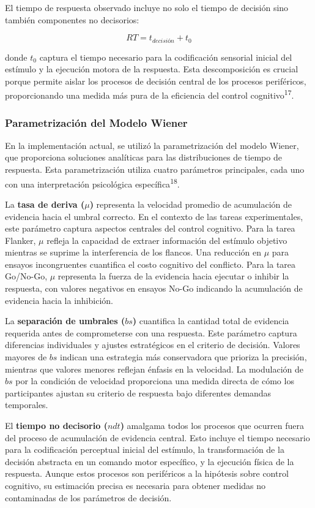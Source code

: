 \documentclass[
  spanish,
  10pt,
]{article}
\begin{document}
El tiempo de respuesta observado incluye no solo el tiempo de decisión
sino también componentes no decisorios:

\[RT = t_{decisión} + t_0\]

donde \(t_0\) captura el tiempo necesario para la codificación sensorial
inicial del estímulo y la ejecución motora de la respuesta. Esta
descomposición es crucial porque permite aislar los procesos de decisión
central de los procesos periféricos, proporcionando una medida más pura
de la eficiencia del control cognitivo\textsuperscript{17}.

\subsubsection{Parametrización del Modelo
Wiener}\label{parametrizaciuxf3n-del-modelo-wiener}

En la implementación actual, se utilizó la parametrización del modelo
Wiener, que proporciona soluciones analíticas para las distribuciones de
tiempo de respuesta. Esta parametrización utiliza cuatro parámetros
principales, cada uno con una interpretación psicológica
específica\textsuperscript{18}.

La \textbf{tasa de deriva (\(\mu\))} representa la velocidad promedio de
acumulación de evidencia hacia el umbral correcto. En el contexto de las
tareas experimentales, este parámetro captura aspectos centrales del
control cognitivo. Para la tarea Flanker, \(\mu\) refleja la capacidad
de extraer información del estímulo objetivo mientras se suprime la
interferencia de los flancos. Una reducción en \(\mu\) para ensayos
incongruentes cuantifica el costo cognitivo del conflicto. Para la tarea
Go/No-Go, \(\mu\) representa la fuerza de la evidencia hacia ejecutar o
inhibir la respuesta, con valores negativos en ensayos No-Go indicando
la acumulación de evidencia hacia la inhibición.

La \textbf{separación de umbrales (\(bs\))} cuantifica la cantidad total
de evidencia requerida antes de comprometerse con una respuesta. Este
parámetro captura diferencias individuales y ajustes estratégicos en el
criterio de decisión. Valores mayores de \(bs\) indican una estrategia
más conservadora que prioriza la precisión, mientras que valores menores
reflejan énfasis en la velocidad. La modulación de \(bs\) por la
condición de velocidad proporciona una medida directa de cómo los
participantes ajustan su criterio de respuesta bajo diferentes demandas
temporales.

El \textbf{tiempo no decisorio (\(ndt\))} amalgama todos los procesos
que ocurren fuera del proceso de acumulación de evidencia central. Esto
incluye el tiempo necesario para la codificación perceptual inicial del
estímulo, la transformación de la decisión abstracta en un comando motor
específico, y la ejecución física de la respuesta. Aunque estos procesos
son periféricos a la hipótesis sobre control cognitivo, su estimación
precisa es necesaria para obtener medidas no contaminadas de los
parámetros de decisión.
\end{document}
